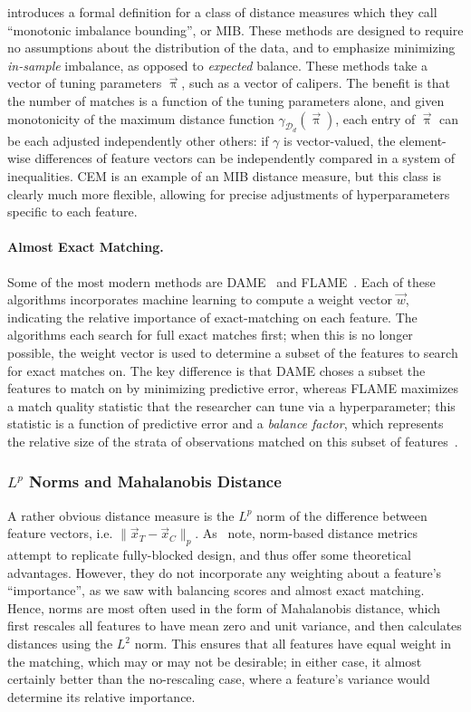 \documentclass[11pt]{extarticle}
\begin{document}
\textcite{iacus_multivariate_2011} introduces a formal definition for a class of distance measures which they call ``monotonic imbalance bounding'', or MIB. These methods are designed to require no assumptions about the distribution of the data, and to emphasize minimizing \emph{in-sample} imbalance, as opposed to \emph{expected} balance. These methods take a vector of tuning parameters $\vec{\uppi}$, such as a vector of calipers. The benefit is that the number of matches is a function of the tuning parameters alone, and given monotonicity of the maximum distance function $\gamma_{\mathcal{D}_{d}}(\vec{\uppi})$, each entry of $\vec{\uppi}$ can be each adjusted independently other others: if $\gamma$ is vector-valued, the element-wise differences of feature vectors can be independently compared in a system of inequalities. CEM is an example of an MIB distance measure, but this class is clearly much more flexible, allowing for precise adjustments of hyperparameters specific to each feature.

\paragraph{Almost Exact Matching.} Some of the most modern methods are DAME~\parencite{liu_interpretable_2019} and FLAME~\parencite{wang_flame_2021}. Each of these algorithms incorporates machine learning to compute a weight vector $\vec{w}$, indicating the relative importance of exact-matching on each feature. The algorithms each search for full exact matches first; when this is no longer possible, the weight vector is used to determine a subset of the features to search for exact matches on.
The key difference is that DAME choses a subset the features to match on by minimizing predictive error, whereas FLAME maximizes a match quality statistic that the researcher can tune via a hyperparameter; this statistic is a function of predictive error and a \emph{balance factor}, which represents the relative size of the strata of observations matched on this subset of features~\parencite{gupta_dame-flame_2021}.

\subsubsection{$L^p$ Norms and Mahalanobis Distance}
\label{subsubsec:normdist}

A rather obvious distance measure is the $L^p$ norm of the difference between feature vectors, i.e. $\| \vec{x}_T - \vec{x}_C \|_p$. 
As~\textcite{king_why_2019} note, norm-based distance metrics attempt to replicate fully-blocked design, and thus offer some theoretical advantages.
However, they do not incorporate any weighting about a feature's ``importance'', as we saw with balancing scores and almost exact matching.
Hence, norms are most often used in the form of Mahalanobis distance, which first rescales all features to have mean zero and unit variance, and then calculates distances using the $L^2$ norm.
This ensures that all features have equal weight in the matching, which may or may not be desirable; in either case, it almost certainly better than the no-rescaling case, where a feature's variance would determine its relative importance.
\end{document}
